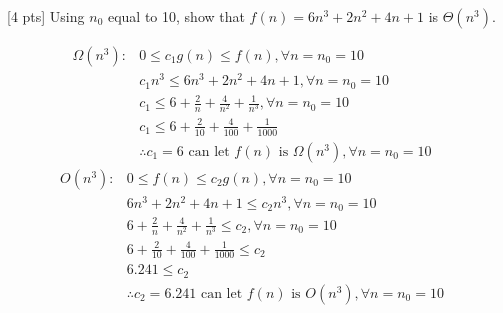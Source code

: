 \documentclass[12pt]{article}
\newenvironment{sol}[1][Solution]{\begin{trivlist}\item[\hskip\labelsep {\bfseries #1:}]}{\end{trivlist}}
\begin{document}
\begin{enumerate}
    \item \ [4 pts] Using $n_0$ equal to 10, show that $f(n) = 6n^3 + 2n^2 + 4n + 1$ is $\Theta(n^3)$.
    \begin{sol}
        \begin{align*}
            \Omega(n^3): & 0 \leq c_1g(n) \leq f(n), \forall n = n_0 = 10\\
            & c_1 n^3 \leq 6n^3 + 2n^2 + 4n + 1, \forall n = n_0 = 10\\
            & c_1 \leq 6 + \frac{2}{n} + \frac{4}{n^2} + \frac{1}{n^3}, \forall n = n_0 = 10\\
            & c_1 \leq 6 + \frac{2}{10} + \frac{4}{100} + \frac{1}{1000}\\
            & \therefore c_1 = 6 \text{ can let }f(n) \text{ is } \Omega(n^3), \forall n = n_0 = 10
        \end{align*}
                \begin{align*}
            O(n^3): & 0 \leq  f(n)\leq c_2g(n), \forall n = n_0 = 10\\
            & 6n^3 + 2n^2 + 4n + 1 \leq c_2 n^3, \forall n = n_0 = 10\\
            & 6 + \frac{2}{n} + \frac{4}{n^2} + \frac{1}{n^3} \leq  c_2 , \forall n = n_0 = 10\\
            & 6 + \frac{2}{10} + \frac{4}{100} + \frac{1}{1000} \leq  c_2\\
            & 6.241 \leq c_2 \\
            & \therefore c_2 = 6.241 \text{ can let }f(n) \text{ is } O(n^3), \forall n = n_0 = 10 \\
        \end{align*}
    \end{sol}



\end{enumerate}
\end{document}
